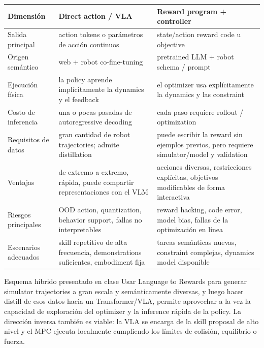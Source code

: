 \begin{longtable}{@{}L{0.20\textwidth}L{0.32\textwidth}L{0.32\textwidth}@{}}
\toprule
Dimensión & Direct action / VLA & Reward program + controller \\
\midrule
Salida principal & action tokens o parámetros de acción continuos & state/action reward code u objective \\
Origen semántico & web + robot co-fine-tuning & pretrained LLM + robot schema / prompt \\
Ejecución física & la policy aprende implícitamente la dynamics y el feedback & el optimizer usa explícitamente la dynamics y las constraint \\
Costo de inferencia & una o pocas pasadas de autoregressive decoding & cada paso requiere rollout / optimization \\
Requisitos de datos & gran cantidad de robot trajectories; admite distillation & puede escribir la reward sin ejemplos previos, pero requiere simulator/model y validation \\
Ventajas & de extremo a extremo, rápida, puede compartir representaciones con el VLM & acciones diversas, restricciones explícitas, objetivos modificables de forma interactiva \\
Riesgos principales & OOD action, quantization, behavior support, fallas no interpretables & reward hacking, code error, model bias, fallas de la optimización en línea \\
Escenarios adecuados & skill repetitivo de alta frecuencia, demonstrations suficientes, embodiment fija & tareas semánticas nuevas, constraint complejas, dynamics model disponible \\
\bottomrule
\end{longtable}

\begin{importantbox}{Esquema híbrido presentado en clase}
Usar Language to Rewards para generar simulator trajectories a gran escala y semánticamente diversas, y luego hacer distill de esos datos hacia un Transformer/VLA, permite aprovechar a la vez la capacidad de exploración del optimizer y la inference rápida de la policy. La dirección inversa también es viable: la VLA se encarga de la skill proposal de alto nivel y el MPC ejecuta localmente cumpliendo los límites de colisión, equilibrio o fuerza.
\end{importantbox}


